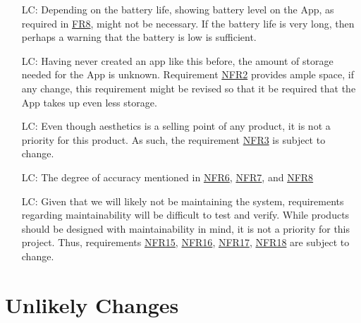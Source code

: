 \documentclass[12pt]{article}
\newcounter{lcnum} %
\begin{document}
\begin{itemize}

\item[LC\refstepcounter{lcnum}\thelcnum\label{LC_meaningfulLabel}:]  Depending on the battery life, showing battery level on the App, as required in \hyperref[FRBatteryLevelDisplay]{FR8}, might not be necessary. If the battery life is very long, then perhaps a warning that the battery is low is sufficient. 
\item[LC\refstepcounter{lcnum}\thelcnum\label{LC_meaningfulLabel}:] Having never created an app like this before, the amount of storage needed for the App is unknown. Requirement \hyperref[NFRStor]{NFR2} provides ample space, if any change, this requirement might be revised so that it be required that the App takes up even less storage. 
\item[LC\refstepcounter{lcnum}\thelcnum\label{LC_meaningfulLabel}:] Even though aesthetics is a selling point of any product, it is not a priority for this product. As such, the requirement \hyperref[NFRVisual]{NFR3} is subject to change. 
\item[LC\refstepcounter{lcnum}\thelcnum\label{LC_meaningfulLabel}:] The degree of accuracy mentioned in \hyperref[NFRAccuracyStatus]{NFR6}, \hyperref[NFRAccuracyPos]{NFR7}, and \hyperref[NFRBatteryLevel]{NFR8}
\item[LC\refstepcounter{lcnum}\thelcnum\label{LC_meaningfulLabel}:] Given that we will likely not be maintaining the system, requirements regarding maintainability will be difficult to test and verify. While products should be designed with maintainability in mind, it is not a priority for this project. Thus, requirements \hyperref[NFRGUI]{NFR15}, \hyperref[NFRController]{NFR16}, \hyperref[NFRCircuit]{NFR17}, \hyperref[NFRMech]{NFR18} are subject to change. 

\end{itemize}

\section{Unlikely Changes}    
\end{document}
